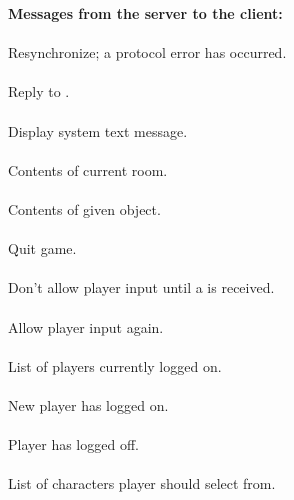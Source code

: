 \begin{protocol}

{\bf Messages from the server to the client:} \\
 \\
Resynchronize; a protocol error has occurred. \\

 \\
Reply to . \\

  \\
Display system text message. \\

   \\ 
Contents of current room. \\

   \\
Contents of given object. \\

 \\
Quit game. \\

 \\
Don't allow player input until a  is received. \\

 \\
Allow player input again. \\

  \\
List of players currently logged on. \\

  \\
New player has logged on. \\

  \\
Player has logged off. \\

    \\
List of characters player should select from. \\
\\
\\


\end{protocol}
